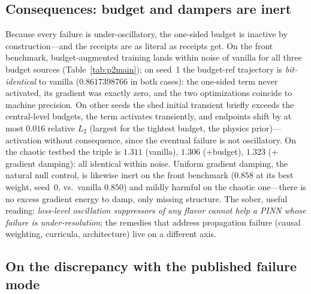 \documentclass[10pt]{article}
\begin{document}
\begin{table}[t]
\centering
\caption{\textbf{In-vivo results.} Relative $L_2$ against the reference (mean
$\pm$ s.d.; seed counts in brackets). Every configuration fails identically:
the budget never has anything to clamp, and damping has nothing to damp.}
\label{tab:p2main}

\end{table}

\subsection{Consequences: budget and dampers are inert}

Because every failure is under-oscillatory, the one-sided budget is inactive by
construction---and the receipts are as literal as receipts get. On the front
benchmark, budget-augmented training lands within noise of vanilla for all three
budget sources (Table~\ref{tab:p2main}); on seed~1 the budget-ref trajectory is
\emph{bit-identical} to vanilla ($0.8617398766$ in both cases): the one-sided term
never activated, its gradient was exactly zero, and the two optimizations
coincide to machine precision. On other seeds the shed initial transient briefly
exceeds the central-level budgets, the term activates transiently, and endpoints
shift by at most $0.016$ relative $L_2$ (largest for the tightest budget, the
physics prior)---activation without consequence, since the eventual failure is
not oscillatory. On the chaotic testbed the triple
is $1.311$ (vanilla), $1.306$ ($+$budget), $1.323$ ($+$gradient damping): all
identical within noise. Uniform gradient damping, the natural null control, is
likewise inert on the front benchmark ($0.858$ at its best weight, seed~0,
vs.\ vanilla $0.850$) and mildly harmful on the chaotic one---there is no excess
gradient energy to damp, only missing structure. The sober, useful reading:
\emph{loss-level oscillation suppressors of any flavor cannot help a PINN whose
failure is under-resolution}; the remedies that address propagation failure
(causal weighting, curricula, architecture) live on a different axis.

\subsection{On the discrepancy with the published failure mode}
\end{document}
